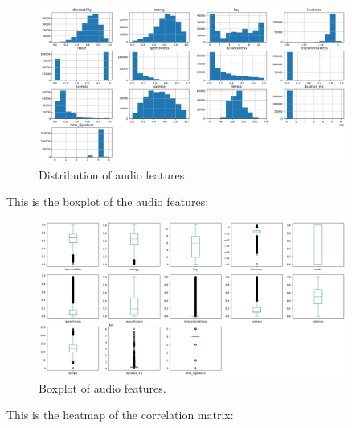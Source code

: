 \begin{figure}[h]
    \centering
    \includegraphics[width=0.9\textwidth]{media/feature_dist_cleaned.png} 
    \caption{Distribution of audio features.}
    \label{distribution}
\end{figure}

This is the boxplot of the audio features:

\begin{figure}[h]
    \centering
    \includegraphics[width=0.9\textwidth]{media/boxplot_cleaned.png} 
    \caption{Boxplot of audio features.}
    \label{boxplot}
\end{figure}

\newpage

This is the heatmap of the correlation matrix:

